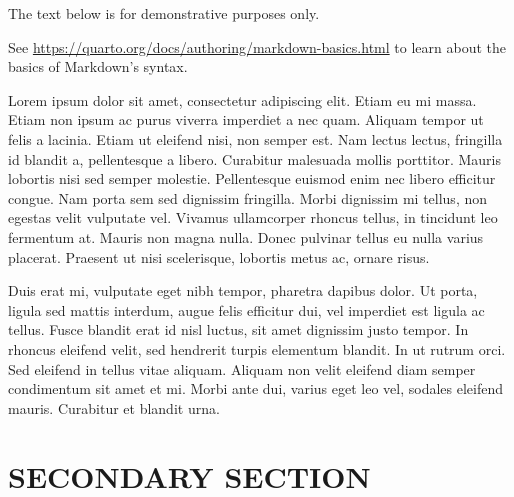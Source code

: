 \documentclass[
  12pt,
  a4paper,
  oneside]{tesesusp}
\begin{document}
\begin{tcolorbox}[enhanced jigsaw, bottomrule=.15mm, colback=white, left=2mm, bottomtitle=1mm, breakable, toprule=.15mm, leftrule=.75mm, rightrule=.15mm, colframe=quarto-callout-important-color-frame, opacityback=0, colbacktitle=quarto-callout-important-color!10!white, titlerule=0mm, coltitle=black, title=\textcolor{quarto-callout-important-color}{\faExclamation}\hspace{0.5em}{Important}, toptitle=1mm, arc=.35mm, opacitybacktitle=0.6]

The text below is for demonstrative purposes only.

\vspace{5pt}

See \url{https://quarto.org/docs/authoring/markdown-basics.html} to
learn about the basics of Markdown's syntax.

\end{tcolorbox}

\vspace{10pt}

Lorem ipsum dolor sit amet, consectetur adipiscing elit. Etiam eu mi
massa. Etiam non ipsum ac purus viverra imperdiet a nec quam. Aliquam
tempor ut felis a lacinia. Etiam ut eleifend nisi, non semper est. Nam
lectus lectus, fringilla id blandit a, pellentesque a libero. Curabitur
malesuada mollis porttitor. Mauris lobortis nisi sed semper molestie.
Pellentesque euismod enim nec libero efficitur congue. Nam porta sem sed
dignissim fringilla. Morbi dignissim mi tellus, non egestas velit
vulputate vel. Vivamus ullamcorper rhoncus tellus, in tincidunt leo
fermentum at. Mauris non magna nulla. Donec pulvinar tellus eu nulla
varius placerat. Praesent ut nisi scelerisque, lobortis metus ac, ornare
risus.

Duis erat mi, vulputate eget nibh tempor, pharetra dapibus dolor. Ut
porta, ligula sed mattis interdum, augue felis efficitur dui, vel
imperdiet est ligula ac tellus. Fusce blandit erat id nisl luctus, sit
amet dignissim justo tempor. In rhoncus eleifend velit, sed hendrerit
turpis elementum blandit. In ut rutrum orci. Sed eleifend in tellus
vitae aliquam. Aliquam non velit eleifend diam semper condimentum sit
amet et mi. Morbi ante dui, varius eget leo vel, sodales eleifend
mauris. Curabitur et blandit urna.

\hypertarget{secondary-section-2}{%
\section{SECONDARY SECTION}\label{secondary-section-2}}
\end{document}
